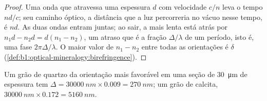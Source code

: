 \begin{proof}
Uma onda que atravessa uma espessura $d$ com velocidade $c/n$ leva o tempo $nd/c$; seu caminho óptico, a distância que a luz percorreria no vácuo nesse tempo, é $nd$. As duas ondas entram juntas; ao sair, a mais lenta está atrás por $n_1 d - n_2 d = d(n_1 - n_2)$, um atraso que é a fração $\Delta/\lambda$ de um período, isto é, uma fase $2\pi\Delta/\lambda$. O maior valor de $n_1 - n_2$ entre todas as orientações é $\delta$ (\cref{def:b1:optical-mineralogy:birefringence}).
\end{proof}

Um grão de quartzo da orientação mais favorável em uma seção de \qty{30}{\micro m} de espessura tem $\Delta = \qty{30000}{nm}\times0.009 =
\qty{270}{nm}$; um grão de calcita, $\qty{30000}{nm}\times0.172 = \qty{5160}{nm}$.

